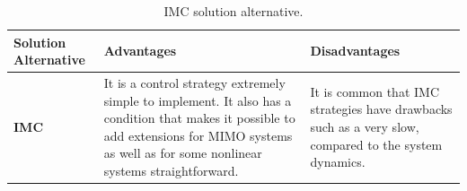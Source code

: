 \documentclass[11pt]{report} %
\begin{document}
\begin{table}[H]
\begin{center}
    \begin{tabular}{M{6.6cm}M{3.3cm}M{3.3cm}}
    \hline
    \textbf{Solution Alternative} & \textbf{Advantages} & \textbf{Disadvantages} \\ 
    \hline
    
    \textbf{IMC}

    
    \citep{cite_IMC_control}
    
    &
    
    It is a control strategy extremely simple to implement. It also has a condition that makes it possible to add extensions for MIMO systems as well as for some nonlinear systems straightforward.

    &
    
    It is common that IMC strategies have drawbacks such as a   very slow, compared to the system dynamics.
    
    \\ \hline
    \end{tabular}
\caption{\label{tab:imc} IMC solution alternative.}
\end{center}
\end{table}
\end{document}
